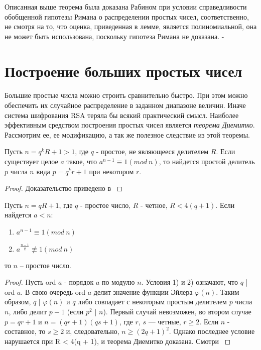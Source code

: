     Описанная выше теорема была доказана Рабином при условии справедливости обобщенной гипотезы Римана о распределении простых чисел, соответственно, не смотря на то, что
  оценка, приведенная в лемме, является полиномиальной, она не может быть использована, поскольку гипотеза Римана не доказана. - \cite[Глава 1.10, страница 29]{ish11}

\section{Построение больших простых чисел}

\paragraph{} Большие простые числа можно строить сравнительно быстро. При этом можно обеспечить их случайное распределение в 
заданном диапазоне величин. Иначе система шифрования RSA теряла бы всякий практический смысл. Наиболее эффективным средством 
построения простых чисел является \textit{теорема Диемитко}. Рассмотрим ее, ее модификацию, а так же полезное следствие из этой теоремы.

  \begin{lemma}
    Пусть {$n = q^k R + 1 > 1$}, где {$q$} - простое, не являющееся делителем {$R$}. Если существует целое {$a$} такое, что
    {$a^{n-1} \equiv 1 (mod \: n)$}, то найдется простой делитель {$p$} числа {$n$} вида {$p=q^kr+1$} при некотором {$r$}.
    
      \begin{proof}
	Доказательство приведено в \cite[Пункт 12.3, страница 63]{cherem02}
      \end{proof}

  \end{lemma}


  \begin{theorem}[Диемитко] \label{eq:prime-theorem-diemitko}
      Пусть {$n = q R + 1$}, где {$q$} - простое число, {$R$} - четное, {$R < 4(q + 1)$}. Если найдется {$a < n$}:
      
	\begin{enumerate}
	 \item {$a^{n - 1} \equiv 1(mod \: n)$}
	 \item {$a^{\frac{n - 1}{q}} \not\equiv 1(mod \: n)$}
	\end{enumerate}
	
      то {$n$} – простое число.
      
      \begin{proof}
	Пусть ord $a$ - порядок $a$ по модулю $n$. Условия 1) и 2) означают, что $q$ | ord $a$. В свою очередь ord $a$ делит значение функции
	Эйлера $\varphi(n)$. Таким образом, $q$ | $\varphi(n)$ и $q$ либо совпадает с некоторым простым делителем $p$ числа $n$, либо делит $p - 1$ 
	(если $p^2$ | $n$). Первый случай невозможен, во втором случае $p = qr + 1$ и $n = (qr + 1)(qs + 1)$, где $r$, $s$ — четные, $r \ge 2$.
	Если $n$ - составное, то $s \ge 2$ и, следовательно, $n \ge (2q + 1)^2$. Однако последнее условие нарушается при R < 4(q + 1), и теорема 
	Диемитко доказана. Смотри \cite[Пункт 12.3, страница 63]{cherem02}
      \end{proof}
  \end{theorem} 
 
